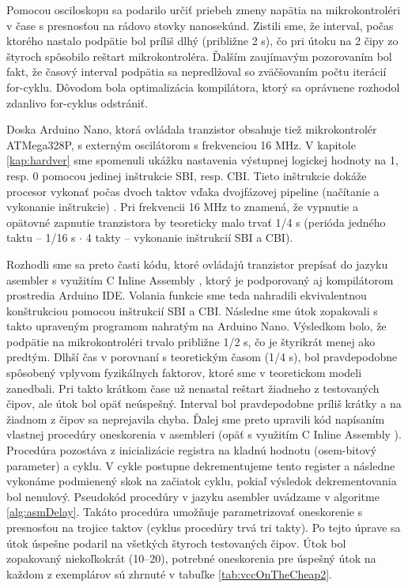 Pomocou osciloskopu sa podarilo určiť priebeh zmeny napätia na mikrokontroléri v čase s presnosťou na rádovo stovky nanosekúnd. Zistili sme, že interval, počas ktorého nastalo podpätie bol príliš dlhý (približne 2 {\textmu}s), čo pri útoku na 2 čipy zo štyroch spôsobilo reštart mikrokontroléra. Ďalším zaujímavým pozorovaním bol fakt, že časový interval podpätia sa nepredlžoval so zväčšovaním počtu iterácií  for-cyklu. Dôvodom bola optimalizácia kompilátora, ktorý sa oprávnene rozhodol zdanlivo  for-cyklus odstrániť.

Doska Arduino Nano, ktorá ovládala tranzistor obsahuje tiež mikrokontrolér ATMega328P, s externým oscilátorom s frekvenciou 16 MHz. V kapitole \ref{kap:hardver} sme spomenuli ukážku nastavenia výstupnej logickej hodnoty na 1, resp. 0 pomocou jedinej inštrukcie SBI, resp. CBI. Tieto inštrukcie dokáže procesor vykonať počas dvoch taktov vďaka dvojfázovej pipeline (načítanie a vykonanie inštrukcie) \cite{atmegaData}. Pri frekvencii 16 MHz to znamená, že vypnutie a opätovné zapnutie tranzistora by teoreticky malo trvať 1/4 {\textmu}s (perióda jedného taktu -- 1/16 {\textmu}s $\cdot$ 4 takty -- vykonanie inštrukcií SBI a CBI). 

Rozhodli sme sa preto časti kódu, ktoré ovládajú tranzistor prepísať do jazyku asembler s využitím C Inline Assembly \cite{inlineAsm}, ktorý je podporovaný aj kompilátorom prostredia Arduino IDE. Volania funkcie  sme teda nahradili ekvivalentnou konštrukciou pomocou inštrukcií SBI a CBI. Následne sme útok zopakovali s takto upraveným programom nahratým na Arduino Nano. Výsledkom bolo, že podpätie na mikrokontroléri trvalo približne 1/2 {\textmu}s, čo je štyrikrát menej ako predtým. Dlhší čas v porovnaní s teoretickým časom (1/4 {\textmu}s), bol pravdepodobne spôsobený vplyvom fyzikálnych faktorov, ktoré sme v teoretickom modeli zanedbali. Pri takto krátkom čase už nenastal reštart žiadneho z testovaných čipov, ale útok bol opäť neúspešný. Interval bol pravdepodobne príliš krátky a na žiadnom z čipov sa neprejavila chyba. Ďalej sme preto upravili kód napísaním vlastnej procedúry oneskorenia v asembleri (opäť s využitím C Inline Assembly \cite{inlineAsm}). Procedúra pozostáva z inicializácie registra na kladnú hodnotu (osem-bitový parameter) a cyklu. V cykle postupne dekrementujeme tento register a následne vykonáme podmienený skok na začiatok cyklu, pokiaľ výsledok dekrementovania bol nenulový. Pseudokód procedúry v jazyku asembler uvádzame v algoritme \ref{alg:asmDelay}. Takáto procedúra umožňuje parametrizovať oneskorenie s presnosťou na trojice taktov (cyklus procedúry trvá tri takty). Po tejto úprave sa útok úspešne podaril na všetkých štyroch testovaných čipov. Útok bol zopakovaný niekoľkokrát (10--20), potrebné oneskorenia pre úspešný útok na každom z exemplárov sú zhrnuté v tabuľke \ref{tab:vccOnTheCheap2}.

